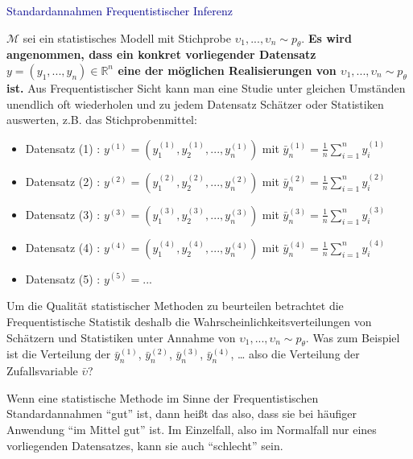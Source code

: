\documentclass[
  8pt,
  ignorenonframetext,
]{beamer}
\newcommand{\ups} {\upsilon}
\begin{document}
\begin{frame}{}
\protect\hypertarget{section-4}{}
\textcolor{darkblue}{Standardannahmen Frequentistischer Inferenz}

\footnotesize

\(\mathcal{M}\) sei ein statistisches Modell mit Stichprobe
\(\ups_1,...,\ups_n \sim p_\theta\). \textbf{Es wird angenommen, dass
ein konkret vorliegender Datensatz
\(y = (y_1,...,y_n) \in \mathbb{R}^n\) eine der möglichen Realisierungen
von \(\ups_1,...,\ups_n \sim p_\theta\) ist.} Aus Frequentistischer
Sicht kann man eine Studie unter gleichen Umständen unendlich oft
wiederholen und zu jedem Datensatz Schätzer oder Statistiken auswerten,
z.B. das Stichprobenmittel:

\footnotesize
\begin{itemize}
\item[] Datensatz (1) : $y^{(1)} = \left(y_1^{(1)}, y_2^{(1)}, ...,y_n^{(1)}\right)$
                        mit $\bar{y}_n^{(1)} = \frac{1}{n}\sum_{i=1}^n y_i^{(1)}$
\item[] Datensatz (2) : $y^{(2)} = \left(y_1^{(2)}, y_2^{(2)}, ...,y_n^{(2)}\right)$
                        mit $\bar{y}_n^{(2)} = \frac{1}{n}\sum_{i=1}^n y_i^{(2)}$
\item[] Datensatz (3) : $y^{(3)} = \left(y_1^{(3)}, y_2^{(3)}, ...,y_n^{(3)}\right)$
                        mit $\bar{y}_n^{(3)} = \frac{1}{n}\sum_{i=1}^n y_i^{(3)}$
\item[] Datensatz (4) : $y^{(4)} = \left(y_1^{(4)}, y_2^{(4)}, ...,y_n^{(4)}\right)$
                        mit $\bar{y}_n^{(4)} = \frac{1}{n}\sum_{i=1}^n y_i^{(4)}$
\item[] Datensatz (5) : $y^{(5)} = ...$
\end{itemize}

Um die Qualität statistischer Methoden zu beurteilen betrachtet die
Frequentistische Statistik deshalb die Wahrscheinlichkeitsverteilungen
von Schätzern und Statistiken unter Annahme von
\(\ups_1,...,\ups_n \sim p_\theta\). Was zum Beispiel ist die Verteilung
der \(\bar{y}_n^{(1)}\), \(\bar{y}_n^{(2)}\), \(\bar{y}_n^{(3)}\),
\(\bar{y}_n^{(4)}\), \ldots{} also die Verteilung der Zufallsvariable
\(\bar{\ups}\)?

Wenn eine statistische Methode im Sinne der Frequentistischen
Standardannahmen ``gut'' ist, dann heißt das also, dass sie bei häufiger
Anwendung ``im Mittel gut'' ist. Im Einzelfall, also im Normalfall nur
eines vorliegenden Datensatzes, kann sie auch ``schlecht'' sein.
\end{frame}
\end{document}
